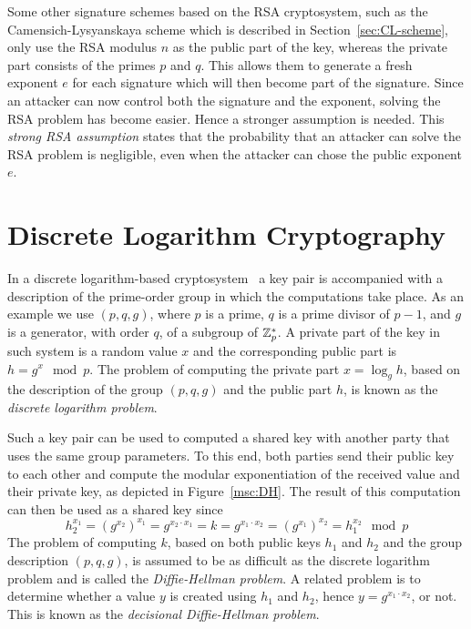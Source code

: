 Some other signature schemes based on the RSA cryptosystem, such as the
Camensich-Lysyanskaya scheme which is described in Section~\ref{sec:CL-scheme},
only use the RSA modulus $n$ as the public part of the key, whereas the private
part consists of the primes $p$ and $q$. This allows them to generate a fresh
exponent $e$ for each signature which will then become part of the signature.
Since an attacker can now control both the signature and the exponent, solving
the RSA problem has become easier. Hence a stronger assumption is needed. This
\emph{strong RSA assumption} states that the probability that an attacker can
solve the RSA problem is negligible, even when the attacker can chose the public
exponent $e$.

\section{Discrete Logarithm Cryptography}

In a discrete logarithm-based cryptosystem~\cite{DH1976,ElGamal1985} a key pair
is accompanied with a description of the prime-order group in which the
computations take place. As an example we use $(p, q, g)$, where $p$ is a prime,
$q$ is a prime divisor of $p-1$, and $g$ is a generator, with order $q$, of a
subgroup of $\mathbb{Z}^*_p$. A private part of the key in such system is a random value
$x$ and the corresponding public part is $h = g^x \mod p$. The problem of
computing the private part $x = \log_g h$, based on the description of the group
$(p, q, g)$ and the public part $h$, is known as the \emph{discrete logarithm
problem}.

Such a key pair can be used to computed a shared key with another party that
uses the same group parameters. To this end, both parties send their public key
to each other and compute the modular exponentiation of the received value and
their private key, as depicted in Figure~\ref{msc:DH}. The result of this
computation can then be used as a shared key since
\begin{equation*}
  h_2^{x_1} = (g^{x_2})^{x_1} = g^{x_2 \cdot x_1}
  = k = g^{x_1 \cdot x_2} = (g^{x_1})^{x_2} = h_1^{x_2} \mod p
\end{equation*}
The problem of computing $k$, based on both public keys $h_1$ and $h_2$ and the
group description $(p, q, g)$, is assumed to be as difficult as the discrete
logarithm problem and is called the \emph{Diffie-Hellman problem}. A related
problem is to determine whether a value $y$ is created using $h_1$ and $h_2$,
hence $y = g^{x_1 \cdot x_2}$, or not. This is known as the \emph{decisional
Diffie-Hellman problem}.

